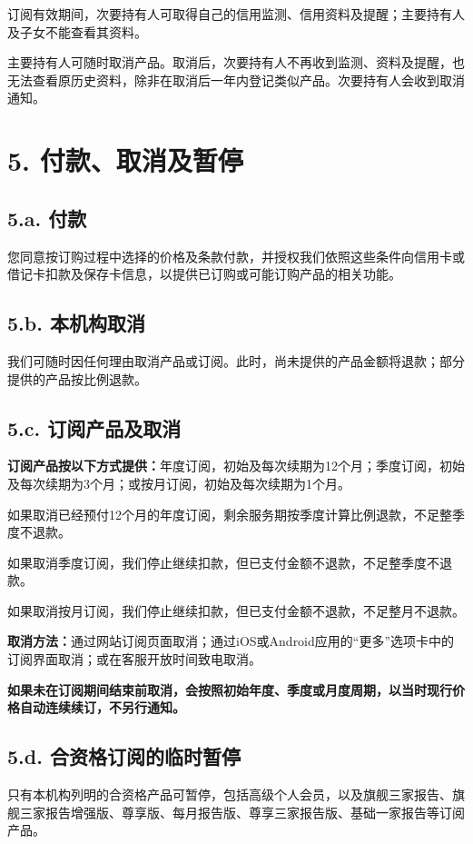 \documentclass[UTF8,fontset=none,11pt,a4paper]{ctexart}
\begin{document}
订阅有效期间，次要持有人可取得自己的信用监测、信用资料及提醒；主要持有人及子女不能查\allowbreak\mbox{看其资料。}


主要持有人可随时取消产品。取消后，次要持有人不再收到监测、资料及提醒，也无法查看原历史资料，除非在取消后一年内登记类似产品。次要持有人会收到\allowbreak\mbox{取消通知。}


\section*{5. 付款、取消及暂停}
\subsection*{5.a. 付款}
您同意按订购过程中选择的价格及条款付款，并授权我们依照这些条件向信用卡或借记卡扣款及保存卡信息，以提供已订购或可能订购产品的\allowbreak\mbox{相关功能。}


\subsection*{5.b. 本机构取消}
我们可随时因任何理由取消产品或订阅。此时，尚未提供的产品金额将退款；部分提供的产品按\allowbreak\mbox{比例退款。}


\subsection*{5.c. 订阅产品及取消}
\textbf{订阅产品按以下方式提供：}年度订阅，初始及每次续期为12个月；季度订阅，初始及每次续期为3个月；或按月订阅，初始及每次续期为1个月。


如果取消已经预付12个月的年度订阅，剩余服务期按季度计算比例退款，不足整季\allowbreak\mbox{度不退款。}


如果取消季度订阅，我们停止继续扣款，但已支付金额不退款，不足整季\allowbreak\mbox{度不退款。}


如果取消按月订阅，我们停止继续扣款，但已支付金额不退款，不足整\allowbreak\mbox{月不退款。}


\textbf{取消方法：}通过网站订阅页面取消；通过iOS或Android应用的“更多”选项卡中的订阅界面取消；或在客服开放时间\allowbreak\mbox{致电取消。}


\textbf{如果未在订阅期间结束前取消，会按照初始年度、季度或月度周期，以当时现行价格自动连续续订，不另行通知。}


\subsection*{5.d. 合资格订阅的临时暂停}
只有本机构列明的合资格产品可暂停，包括高级个人会员，以及旗舰三家报告、旗舰三家报告增强版、尊享版、每月报告版、尊享三家报告版、基础一家报告等\allowbreak\mbox{订阅产品。}
\end{document}
